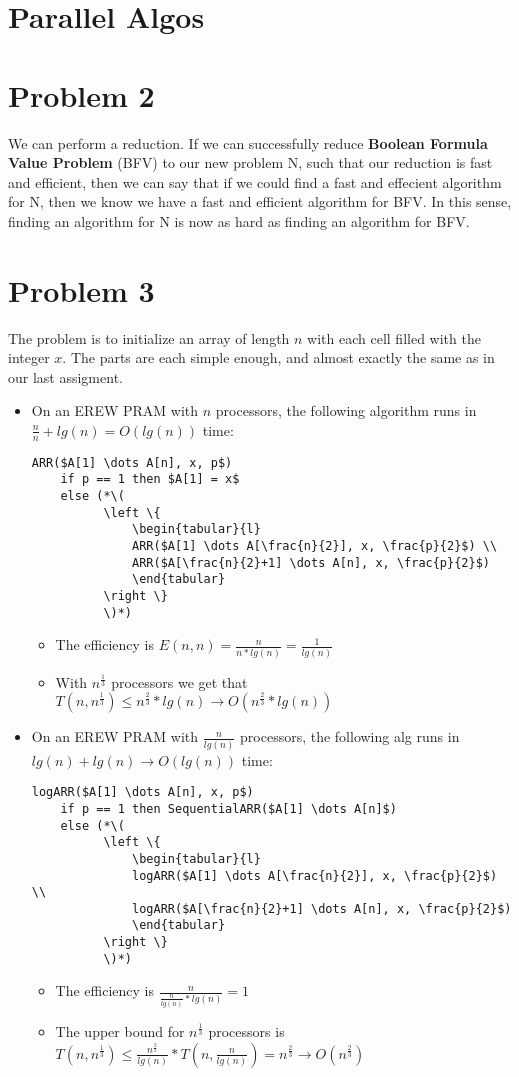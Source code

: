 \documentclass{article}
\providecommand{\prob}[1]{\section*{Problem #1}}
\begin{document}
\pagebreak
\section*{Parallel Algos}
\prob{2}
We can perform a reduction. If we can successfully reduce \textbf{Boolean Formula Value Problem} (BFV) to our new problem N, such that our reduction is fast and efficient, then we can say that if we could find a fast and effecient algorithm for N, then we know we have a fast and efficient algorithm for BFV.
In this sense, finding an algorithm for N is now as hard as finding an algorithm for BFV.

\prob{3}
The problem is to initialize an array of length $n$ with each cell filled with the integer $x$. The parts are each simple enough, and almost exactly the same as in our last assigment.
\begin{itemize}
  \item On an EREW PRAM with $n$ processors, the following algorithm runs in $\frac{n}{n} + lg(n) = O(lg(n))$ time:
  \begin{lstlisting}
ARR($A[1] \dots A[n], x, p$)
    if p == 1 then $A[1] = x$
    else (*\(
          \left \{
              \begin{tabular}{l}
              ARR($A[1] \dots A[\frac{n}{2}], x, \frac{p}{2}$) \\
              ARR($A[\frac{n}{2}+1] \dots A[n], x, \frac{p}{2}$)
              \end{tabular}
          \right \}
          \)*)
  \end{lstlisting}
  \begin{itemize}
    \item The efficiency is $E(n,n) = \frac{n}{n*lg(n)} = \frac{1}{lg(n)}$
    \item With $n^{\frac{1}{3}}$ processors we get that $T(n,n^{\frac{1}{3}}) \leq n^{\frac{2}{3}}*lg(n) \rightarrow O(n^{\frac{2}{3}}*lg(n))$
  \end{itemize}

  \item On an EREW PRAM with $\frac{n}{lg(n)}$ processors, the following alg runs in $lg(n) + lg(n) \rightarrow O(lg(n))$ time:
  \begin{lstlisting}
logARR($A[1] \dots A[n], x, p$)
    if p == 1 then SequentialARR($A[1] \dots A[n]$)
    else (*\(
          \left \{
              \begin{tabular}{l}
              logARR($A[1] \dots A[\frac{n}{2}], x, \frac{p}{2}$) \\
              logARR($A[\frac{n}{2}+1] \dots A[n], x, \frac{p}{2}$)
              \end{tabular}
          \right \}
          \)*)
  \end{lstlisting}
  \begin{itemize}
    \item The efficiency is $\frac{n}{\frac{n}{lg(n)}*lg(n)} = 1$
    \item The upper bound for $n^{\frac{1}{3}}$ processors is $T(n,n^{\frac{1}{3}}) \leq \frac{n^{\frac{2}{3}}}{lg(n)}*T(n,\frac{n}{lg(n)}) = n^{\frac{2}{3}} \rightarrow O(n^{\frac{2}{3}})$
  \end{itemize}


\end{itemize}
\end{document}
